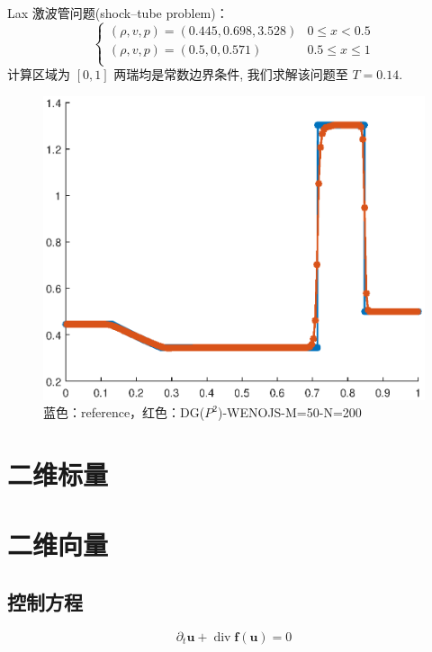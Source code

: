 \documentclass{book}
\begin{document}
\begin{example}{}{}
    Lax 激波管问题(shock–tube problem)\cite{RN204}：
    \begin{equation}
        \begin{cases}
            (\rho, v, p)  =(0.445,0.698,3.528) & 0\leqslant x < 0.5         \\
            (\rho, v, p) =(0.5,0,0.571)        & 0.5\leqslant x \leqslant 1 \\
        \end{cases}
    \end{equation}
    计算区域为 $[0,1]$ 两瑞均是常数边界条件, 我们求解该问题至 $T=0.14$.
    \begin{figure}[H]
        \centering
        \label{fig:}
        \includegraphics[width=0.7\linewidth]{fig/lax.eps}
        \caption{蓝色：reference，红色：DG($P^2$)-WENOJS-M=50-N=200}
    \end{figure}

\end{example}
\section{二维标量}

\section{二维向量}
\subsection{控制方程}
\begin{equation}
    \partial_{t} \boldsymbol{u}+\operatorname{div} \boldsymbol{f} (\boldsymbol{u})=0
\end{equation}
\end{document}
